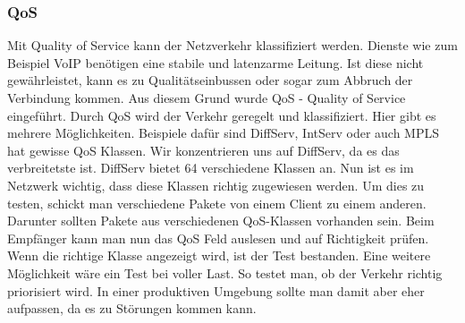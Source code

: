 \documentclass[a4,12pt]{scrartcl}
\begin{document}
\subsubsection{QoS}
Mit Quality of Service kann der Netzverkehr klassifiziert werden. Dienste wie zum Beispiel VoIP benötigen eine stabile und latenzarme Leitung. Ist diese nicht gewährleistet, kann es zu Qualitätseinbussen oder sogar zum Abbruch der Verbindung kommen. Aus diesem Grund wurde QoS - Quality of Service eingeführt. Durch QoS wird der Verkehr geregelt und klassifiziert. Hier gibt es mehrere Möglichkeiten. Beispiele dafür sind DiffServ, IntServ oder auch MPLS hat gewisse QoS Klassen. Wir konzentrieren uns auf DiffServ, da es das verbreitetste ist.\newline\newline
DiffServ bietet 64 verschiedene Klassen an. Nun ist es im Netzwerk wichtig, dass diese Klassen richtig zugewiesen werden. Um dies zu testen, schickt man verschiedene Pakete von einem Client zu einem anderen. Darunter sollten Pakete aus verschiedenen QoS-Klassen vorhanden sein. Beim Empfänger kann man nun das QoS Feld auslesen und auf Richtigkeit prüfen. Wenn die richtige Klasse angezeigt wird, ist der Test bestanden.\newline\newline
Eine weitere Möglichkeit wäre ein Test bei voller Last. So testet man, ob der Verkehr richtig priorisiert wird. In einer produktiven Umgebung sollte man damit aber eher aufpassen, da es zu Störungen kommen kann.\\
\end{document}
